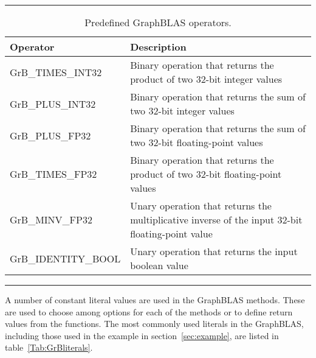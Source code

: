 \begin{table}[h]
\hrule
\begin{center}
\caption{Predefined GraphBLAS operators.}
\label{Tab:GrBops}
\begin{tabular}{lp{5.25cm}}
Operator                           & Description  \\
\hline
	{\sf GrB\_TIMES\_INT32}    & Binary operation that returns the product of two 32-bit integer values \\
	{\sf GrB\_PLUS\_INT32}     & Binary operation that returns the sum of two 32-bit integer values \\
	{\sf GrB\_PLUS\_FP32}      & Binary operation that returns the sum of two 32-bit floating-point values \\
	{\sf GrB\_TIMES\_FP32}     & Binary operation that returns the product of two 32-bit floating-point values \\
	{\sf GrB\_MINV\_FP32}      & Unary operation that returns the multiplicative inverse of the input 32-bit floating-point value \\
	{\sf GrB\_IDENTITY\_BOOL}  & Unary operation that returns the input boolean value \\
\end{tabular}
\end{center}
\hrule
\end{table}
A number of constant literal values are used in the GraphBLAS methods.  These are used to 
choose among options for each of the methods or to define return values from the functions.
The most commonly used literals in the GraphBLAS, including those used in the example in 
section~\ref{sec:example}, are listed in table~\ref{Tab:GrBliterals}.
